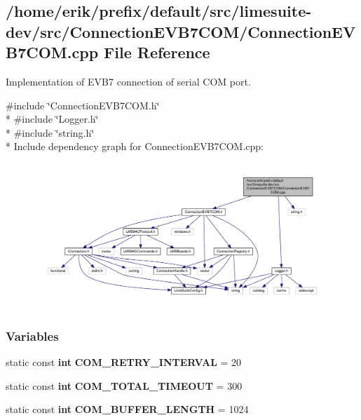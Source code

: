\subsection{/home/erik/prefix/default/src/limesuite-\/dev/src/\+Connection\+E\+V\+B7\+C\+O\+M/\+Connection\+E\+V\+B7\+C\+OM.cpp File Reference}
\label{ConnectionEVB7COM_8cpp}


Implementation of E\+V\+B7 connection of serial C\+OM port.  


{\ttfamily \#include \char`\"{}Connection\+E\+V\+B7\+C\+O\+M.\+h\char`\"{}}\\*
{\ttfamily \#include \char`\"{}Logger.\+h\char`\"{}}\\*
{\ttfamily \#include \char`\"{}string.\+h\char`\"{}}\\*
Include dependency graph for Connection\+E\+V\+B7\+C\+O\+M.\+cpp\+:
\nopagebreak
\begin{figure}[H]
\begin{center}
\leavevmode
\includegraphics[width=350pt]{d8/da6/ConnectionEVB7COM_8cpp__incl}
\end{center}
\end{figure}
\subsubsection*{Variables}
\begin{DoxyCompactItemize}
\item 
static const {\bf int} {\bf C\+O\+M\+\_\+\+R\+E\+T\+R\+Y\+\_\+\+I\+N\+T\+E\+R\+V\+AL} = 20
\item 
static const {\bf int} {\bf C\+O\+M\+\_\+\+T\+O\+T\+A\+L\+\_\+\+T\+I\+M\+E\+O\+UT} = 300
\item 
static const {\bf int} {\bf C\+O\+M\+\_\+\+B\+U\+F\+F\+E\+R\+\_\+\+L\+E\+N\+G\+TH} = 1024
\end{DoxyCompactItemize}


